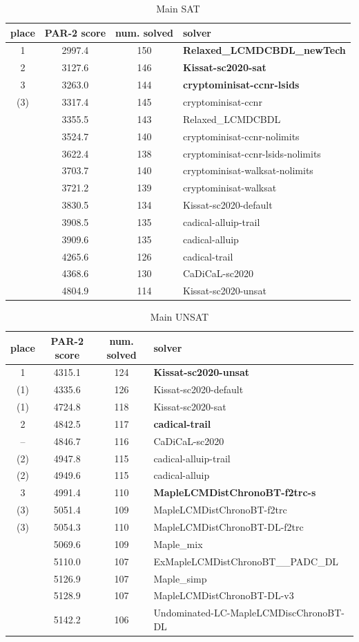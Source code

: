 \documentclass{elsarticle}
\begin{document}
\begin{table}
\caption{Main SAT}
\label{tab:mainSAT}
\begin{tabular}{cccl}
place & PAR-2 score & num. solved & solver \\
\hline
 1 & 2997.4 & 150 & {\bf Relaxed\_LCMDCBDL\_newTech} \\
 2 & 3127.6 & 146 & {\bf Kissat-sc2020-sat} \\
 3 & 3263.0 & 144 & {\bf cryptominisat-ccnr-lsids} \\
(3)& 3317.4 & 145 & cryptominisat-ccnr \\
   & 3355.5 & 143 & Relaxed\_LCMDCBDL \\
   & 3524.7 & 140 & cryptominisat-ccnr-nolimits \\
   & 3622.4 & 138 & cryptominisat-ccnr-lsids-nolimits \\
   & 3703.7 & 140 & cryptominisat-walksat-nolimits \\
   & 3721.2 & 139 & cryptominisat-walksat \\
   & 3830.5 & 134 & Kissat-sc2020-default \\
   & 3908.5 & 135 & cadical-alluip-trail \\
   & 3909.6 & 135 & cadical-alluip \\
   & 4265.6 & 126 & cadical-trail \\
   & 4368.6 & 130 & CaDiCaL-sc2020 \\
   & 4804.9 & 114 & Kissat-sc2020-unsat \\
\end{tabular}
\end{table}


\begin{table}
\caption{Main UNSAT}
\label{tab:mainUNSAT}
\begin{tabular}{cccl}
place & PAR-2 score & num. solved & solver \\
\hline
1  & 4315.1 & 124 & {\bf Kissat-sc2020-unsat} \\
(1)& 4335.6 & 126 & Kissat-sc2020-default \\
(1)& 4724.8 & 118 & Kissat-sc2020-sat \\
 2 & 4842.5 & 117 & {\bf cadical-trail} \\
-- & 4846.7 & 116 & CaDiCaL-sc2020 \\
(2)& 4947.8 & 115 & cadical-alluip-trail \\
(2)& 4949.6 & 115 & cadical-alluip \\
 3 & 4991.4 & 110 & {\bf MapleLCMDistChronoBT-f2trc-s} \\
(3)& 5051.4 & 109 & MapleLCMDistChronoBT-f2trc \\
(3)& 5054.3 & 110 & MapleLCMDistChronoBT-DL-f2trc \\
   & 5069.6 & 109 & Maple\_mix \\
   & 5110.0 & 107 & ExMapleLCMDistChronoBT\_\_PADC\_DL \\
   & 5126.9 & 107 & Maple\_simp \\
   & 5128.9 & 107 & MapleLCMDistChronoBT-DL-v3 \\
   & 5142.2 & 106 & Undominated-LC-MapleLCMDiscChronoBT-DL \\
\end{tabular}
\end{table}
\end{document}
